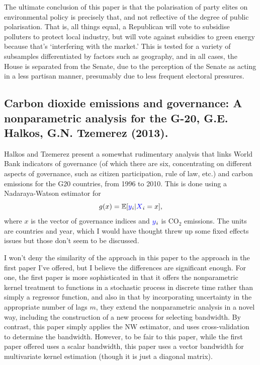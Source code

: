 \documentclass{article}
\renewcommand{\r}[1]{\textcolor{blue}{#1}}
\newcommand{\E}{\mathbb{E}}
\begin{document}
The ultimate conclusion of this paper is that the polarisation of party elites on environmental policy is precisely that, and not reflective of the degree of public polarisation. That is, all things equal, a Republican will vote to subsidise polluters to protect local industry, but will vote against subsidies to green energy because that's `interfering with the market.' This is tested for a variety of subsamples differentiated by factors such as geography, and in all cases, the House is separated from the Senate, due to the perception of the Senate as acting in a less partisan manner, presumably due to less frequent electoral pressures. 


\subsection{Carbon dioxide emissions and governance: A nonparametric analysis for the G-20, G.E. Halkos, G.N. Tzemerez (2013)\cite{halkos2013}.}
Halkos and Tzemerez present a somewhat rudimentary analysis that links World Bank indicators of governance (of which there are six, concentrating on different aspects of governance, such as citizen participation, rule of law, etc.) and carbon emissions for the G20 countries, from 1996 to 2010. This is done using a Nadaraya-Watson estimator for
\begin{equation} g(x) = \E[\r{y}_{i}|\r{X}_{i}=x],\end{equation}
where $x$ is the vector of governance indices and $\r{y}_{i}$ is CO$_{2}$ emissions. The units are countries and year, which I would have thought threw up some fixed effects issues but those don't seem to be discussed.

I won't deny the similarity of the approach in this paper to the approach in the first paper I've offered, but I believe the differences are significant enough. For one, the first paper is more sophisticated in that it offers the nonparametric kernel treatment to functions in a stochastic process in discrete time rather than simply a regressor function, and also in that by incorporating uncertainty in the appropriate number of lags $m$, they extend the nonparametric analysis in a novel way, including the construction of a new process for selecting bandwidth. By contrast, this paper simply applies the NW estimator, and uses cross-validation to determine the bandwidth. However, to be fair to this paper, while the first paper offered uses a scalar bandwidth, this paper uses a vector bandwidth for multivariate kernel estimation (though it is just a diagonal matrix).
\end{document}
